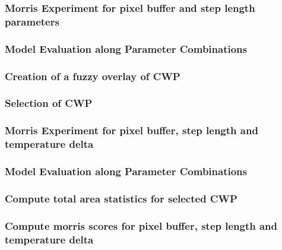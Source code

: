 \subsubsection{Morris Experiment for pixel buffer and step length parameters}

\subsubsection{Model Evaluation along Parameter Combinations}


\subsubsection{Creation of a fuzzy overlay of CWP}

\subsubsection{Selection of CWP}

\subsubsection{Morris Experiment for pixel buffer, step length and temperature delta}

\subsubsection{Model Evaluation along Parameter Combinations}

\subsubsection{Compute total area statistics for selected CWP}

\subsubsection{Compute morris scores for pixel buffer, step length and temperature delta}





